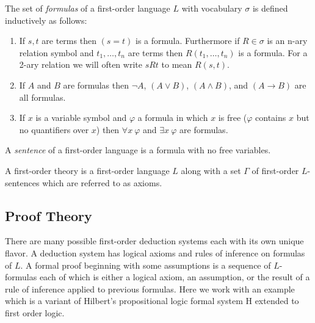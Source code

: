 \documentclass[12pt]{article}
\newcommand{\uq}[1]{\forall{#1} \:}
\renewcommand{\eq}[1]{\exists{#1} \:}
\begin{document}
\begin{definition}
The set of \textit{formulas} of a first-order language $L$ with vocabulary $\sigma$ is defined inductively as follows:
\begin{enumerate}
\item If $s,t$ are terms then $(s = t)$ is a formula. Furthermore if $R \in \sigma$ is an n-ary relation symbol and $t_1, \dots, t_n$ are terms then $R(t_1, \dots, t_n)$ is a formula. For a 2-ary relation we will often write $s R t$ to mean $R(s, t)$. 
\item If $A$ and $B$ are formulas then $\neg A$, $(A \vee B)$, $(A \wedge B)$, and $(A \to B)$ are all formulas.
\item If $x$ is a variable symbol and $\varphi$ a formula in which $x$ is free ($\varphi$ contains $x$ but no quantifiers over $x$) then $\uq{x} \varphi$ and $\eq{x} \varphi$ are formulas. 
\end{enumerate}
\end{definition}

\begin{definition}
A \textit{sentence} of a first-order language is a formula with no free variables.  
\end{definition}

\begin{definition}
A first-order theory is a first-order language $L$ along with a set $\Gamma$ of first-order $L$-sentences which are referred to as axioms. 
\end{definition}

\subsection{Proof Theory}

There are many possible first-order deduction systems each with its own unique flavor. A deduction system has logical axioms and rules of inference on formulas of $L$. A formal proof beginning with some assumptions is a sequence of $L$-formulas each of which is either a logical axiom, an assumption, or the result of a rule of inference applied to previous formulas. Here we work with an example which is a variant of Hilbert's propositional logic formal system H extended to first order logic.
\end{document}
